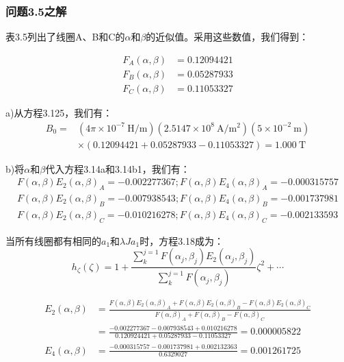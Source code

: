 \subsubsection{问题3.5之解}
表3.5列出了线圈A、B和C的$\alpha$和$\beta$的近似值。采用这些数值，我们得到：


\begin{eqnarray*}%
F_A(\alpha,\beta)&=0.12094421\\
F_B(\alpha,\beta)&=0.05287933\\
F_C(\alpha,\beta)&=0.11053327
\end{eqnarray*}

a)从方程3.125，我们有：
\begin{equation*}%
\begin{split}
B_0=&(4\pi\times 10^{-7}\ \mathrm{H/m})(2.5147\times 10^8\ \mathrm{ A/m^2})(5\times 10^{-2}\ \mathrm{m})\\
&\times(0.12094421+0.05287933-0.11053327)=1.000\ \mathrm{T}
\end{split}
\end{equation*}

b)将$\alpha$和$\beta$代入方程3.14a和3.14b1，我们有：
 \begin{eqnarray*}%
F(\alpha,\beta)E_2(\alpha,\beta)_A=-0.002277367;F(\alpha,\beta)E_4(\alpha,\beta)_A=-0.000315757\\
F(\alpha,\beta)E_2(\alpha,\beta)_B=-0.007938543;F(\alpha,\beta)E_4(\alpha,\beta)_B=-0.001737981\\
F(\alpha,\beta)E_2(\alpha,\beta)_C=-0.010216278;F(\alpha,\beta)E_4(\alpha,\beta)_C=-0.002133593
\end{eqnarray*}

当所有线圈都有相同的$a_1$和$\lambda J a_1$时，方程3.18成为：
\begin{equation*}%
h_\zeta(\zeta)=1+\frac{\sum_{k}^{j=1}F(\alpha_j,\beta_j)E_2(\alpha_j,\beta_j)}{\sum_{k}^{j=1}F(\alpha_j,\beta_j)}\zeta^2+\cdots \tag{S5.1}
\end{equation*}

\begin{align*}
E_2(\alpha,\beta)&=\frac{F(\alpha,\beta)E_2(\alpha,\beta)_A+F(\alpha,\beta)E_2(\alpha,\beta)_B-F(\alpha,\beta)E_2(\alpha,\beta)_C}{F(\alpha,\beta)_A+F(\alpha,\beta)_B-F(\alpha,\beta)_C}\\
&=\frac{-0.002277367-0.007938543+0.010216278}{0.120924421+0.05287933-0.11053327}=0.000005822\\
E_4(\alpha,\beta)&=\frac{-0.000315757-0.001737981+0.002132363}{0.6329027}=0.001261725
\end{align*}

